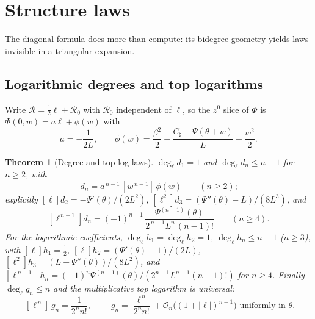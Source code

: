 \documentclass[11pt,oneside]{article}
\numberwithin{equation}{section}
\newtheorem{theorem}{Theorem}[section]
\theoremstyle{definition}
\theoremstyle{remark}
\newcommand{\bigO}{\mathcal O}
\newcommand{\abs}[1]{\left\lvert #1\right\rvert}
\newcommand{\Csharp}{C_{\sharp}}
\begin{document}
\section{Structure laws}
\label{sec:structure}

The diagonal formula does more than compute: its bidegree geometry
yields laws invisible in a triangular expansion.

\subsection{Logarithmic degrees and top logarithms}

Write $\mathcal R=\tfrac12\ell+\mathcal R_0$ with $\mathcal R_0$
independent of $\ell$, so the $z^{0}$ slice of $\Phi$ is
$\Phi(0,w)=a\ell+\phi(w)$ with
\begin{equation}
 a=-\frac1{2L},
 \qquad
 \phi(w)=\frac{\beta^{2}}2+\frac{\Csharp+\Psi(\theta+w)}L
 -\frac{w^{2}}2.
 \label{eq:a-phi}
\end{equation}

\begin{theorem}[Degree and top-log laws]
\label{thm:top-log}
$\deg_\ell d_1=1$ and $\deg_\ell d_n\le n-1$ for $n\ge2$, with
\begin{equation}
 [\ell^{\,n-1}]\,d_n=a^{\,n-1}\,[w^{\,n-1}]\,\phi(w)
 \qquad(n\ge2);
 \label{eq:d-top-log}
\end{equation}
explicitly $[\ell]d_2=-\Psi'(\theta)/(2L^{2})$,
$[\ell^{2}]d_3=(\Psi''(\theta)-L)/(8L^{3})$, and
\[
 [\ell^{\,n-1}]d_n
 =(-1)^{n-1}\,
 \frac{\Psi^{(n-1)}(\theta)}{2^{\,n-1}L^{n}\,(n-1)!}
 \qquad(n\ge4).
\]
For the logarithmic coefficients,
$\deg_\ell h_1=\deg_\ell h_2=1$, $\deg_\ell h_n\le n-1$
($n\ge3$), with $[\ell]h_1=\tfrac12$,
$[\ell]h_2=(\Psi'(\theta)-1)/(2L)$,
$[\ell^{2}]h_3=(L-\Psi''(\theta))/(8L^{2})$, and
$[\ell^{\,n-1}]h_n
=(-1)^{n}\Psi^{(n-1)}(\theta)/(2^{n-1}L^{n-1}(n-1)!)$ for
$n\ge4$.  Finally $\deg_\ell g_n\le n$ and the multiplicative top
logarithm is \emph{universal}:
\begin{equation}
 \boxed{\;[\ell^{\,n}]\,g_n=\frac1{2^{n}n!},\;}
 \qquad
 g_n=\frac{\ell^{\,n}}{2^{n}n!}
 +\bigO_n\bigl((1+\abs\ell)^{n-1}\bigr)
 \text{ uniformly in }\theta.
 \label{eq:universal-top-log}
\end{equation}
\end{theorem}
\end{document}
